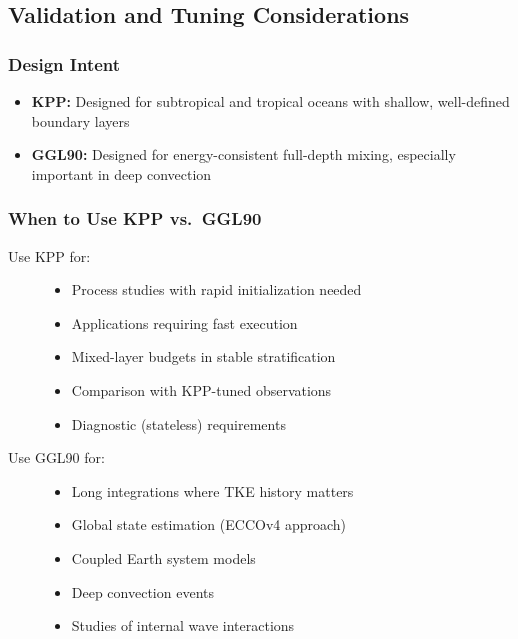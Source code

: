 \documentclass[11pt, a4paper]{article}
\begin{document}
\subsection{Validation and Tuning Considerations}

\subsubsection{Design Intent}

\begin{itemize}
    \item \textbf{KPP:} Designed for subtropical and tropical oceans with shallow, well-defined boundary layers
    \item \textbf{GGL90:} Designed for energy-consistent full-depth mixing, especially important in deep convection
\end{itemize}

\subsubsection{When to Use KPP vs.\ GGL90}

\begin{description}
    \item[Use KPP for:]
    \begin{itemize}
        \item Process studies with rapid initialization needed
        \item Applications requiring fast execution
        \item Mixed-layer budgets in stable stratification
        \item Comparison with KPP-tuned observations
        \item Diagnostic (stateless) requirements
    \end{itemize}
    
    \item[Use GGL90 for:]
    \begin{itemize}
        \item Long integrations where TKE history matters
        \item Global state estimation (ECCOv4 approach)
        \item Coupled Earth system models
        \item Deep convection events
        \item Studies of internal wave interactions
    \end{itemize}
\end{description}
\end{document}
